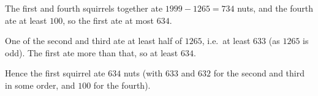The first and fourth squirrels together ate $1999-1265=734$ nuts, and the fourth ate at least $100$, so the first ate at most $634$.

One of the second and third ate at least half of $1265$, i.e.\ at least $633$ (as $1265$ is odd). The first ate more than that, so at least $634$.

Hence the first squirrel ate $\boxed{634}$ nuts (with $633$ and $632$ for the second and third in some order, and $100$ for the fourth).

